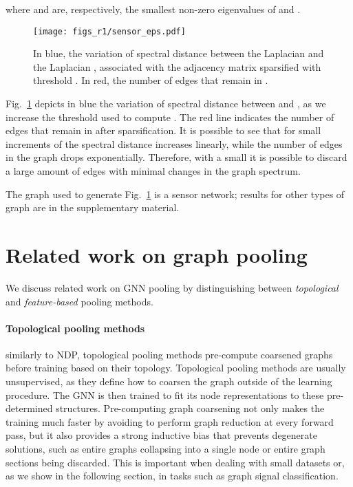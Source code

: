 \documentclass[journal]{IEEEtran}
\begin{document}
where  and  are, respectively, the  smallest non-zero eigenvalues of  and .

\begin{figure}[!ht]
	    \centering
        \texttt{[image: figs\_r1/sensor\_eps.pdf]}
	    \caption{In blue, the variation of spectral distance between the Laplacian  and the Laplacian , associated with the adjacency matrix  sparsified with threshold . In red, the number of edges that remain in .}
	    \label{fig:varying_eps}
\end{figure}
Fig.~\ref{fig:varying_eps} depicts in blue the variation of spectral distance between  and , as we increase the threshold  used to compute . 
The red line indicates the number of edges that remain in  after sparsification.
It is possible to see that for small increments of  the spectral distance increases linearly, while the number of edges in the graph drops exponentially.
Therefore, with a small  it is possible to discard a large amount of edges with minimal changes in the graph spectrum.

The graph used to generate Fig.~\ref{fig:varying_eps} is a sensor network; results for other types of graph are in the supplementary material.

\section{Related work on graph pooling}
\label{sec:related_work}

We discuss related work on GNN pooling by distinguishing between \textit{topological} and \textit{feature-based} pooling methods.

\paragraph{Topological pooling methods}
similarly to NDP, topological pooling methods pre-compute coarsened graphs before training based on their topology.
Topological pooling methods are usually unsupervised, as they define how to coarsen the graph outside of the learning procedure. 
The GNN is then trained to fit its node representations to these pre-determined structures.
Pre-computing graph coarsening not only makes the training much faster by avoiding to perform graph reduction at every forward pass, but it also provides a strong inductive bias that prevents degenerate solutions, such as entire graphs collapsing into a single node or entire graph sections being discarded.
This is important when dealing with small datasets or, as we show in the following section, in tasks such as graph signal classification.
\end{document}
